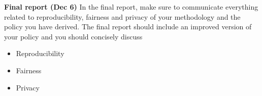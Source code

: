 \textbf{Final report (Dec 6)} In the final report, make sure to communicate everything related to reproducibility, fairness and privacy of your methodology and the policy you have derived. The final report should include an improved version of your policy and you should concisely discuss 
\begin{itemize}
\item Reproducibility
\item Fairness
\item Privacy
\end{itemize}







